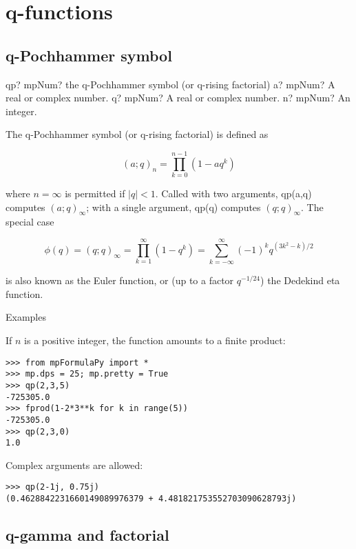 \newpage
\chapter{q-functions}

\section{q-Pochhammer symbol}


\begin{mpFunctionsExtract}
	\mpFunctionThree
	{qp? mpNum? the q-Pochhammer symbol (or q-rising factorial)}
	{a? mpNum? A real or complex number.}
	{q? mpNum? A real or complex number.}	
	{n? mpNum? An integer.}		
\end{mpFunctionsExtract}

\vpara
The q-Pochhammer symbol (or q-rising factorial) is defined as

\begin{equation}
(a; q)_n = \prod_{k=0}^{n-1} (1-aq^k)
\end{equation}

where $n=\infty$ is permitted if $|q|<1$. Called with two arguments, qp(a,q) computes $(a;q)_{\infty}$; with a single argument, qp(q) computes $(q;q)_{\infty}$. The special case

\begin{equation}
\phi(q) = (q;q)_{\infty} = \prod_{k=1}^{\infty}(1-q^k) = \sum_{k=-\infty}^{\infty}(-1)^k q^{(3k^2-k)/2}
\end{equation}

is also known as the Euler function, or (up to a factor $q^{-1/24}$) the Dedekind eta function.

Examples

If $n$ is a positive integer, the function amounts to a finite product:

\begin{lstlisting}
>>> from mpFormulaPy import *
>>> mp.dps = 25; mp.pretty = True
>>> qp(2,3,5)
-725305.0
>>> fprod(1-2*3**k for k in range(5))
-725305.0
>>> qp(2,3,0)
1.0
\end{lstlisting}

Complex arguments are allowed:

\begin{lstlisting}
>>> qp(2-1j, 0.75j)
(0.4628842231660149089976379 + 4.481821753552703090628793j)
\end{lstlisting}


\newpage
\section{q-gamma and factorial}

